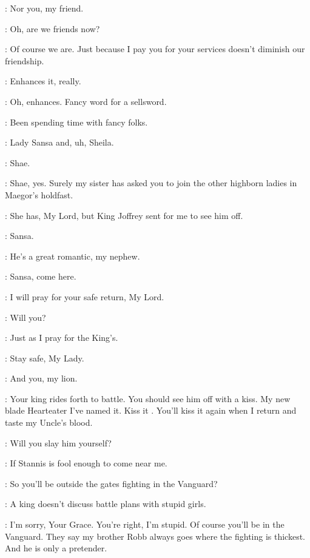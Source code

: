 \TYRION: Nor you, my friend. 

\BRONN: Oh, are we friends now? 

\TYRION: Of course we are. Just because I pay you for your services doesn't diminish our friendship. 

\BRONN: Enhances it, really. 

\TYRION: Oh, enhances. Fancy word for a sellsword. 

\BRONN: Been spending time with fancy folks. 


\TYRION: Lady Sansa and, uh, Sheila. 

\SHAE: Shae. 

\TYRION: Shae, yes. Surely my sister has asked you to join the other highborn ladies in Maegor's holdfast. 

\SANSA: She has, My Lord, but King Joffrey sent for me to see him off. 

\JOFFREY:  Sansa. 

\TYRION: He's a great romantic, my nephew. 

\JOFFREY: Sansa, come here. 

\SANSA: I will pray for your safe return, My Lord. 

\TYRION: Will you? 

\SANSA: Just as I pray for the King's. 


\TYRION:  Stay safe, My Lady. 

\SHAE: And you, my lion. 

\JOFFREY: Your king rides forth to battle. You should see him off with a kiss. My new blade  Hearteater I've named it. Kiss it . You'll kiss it again when I return and taste my Uncle's blood.

\SANSA: Will you slay him yourself? 

\JOFFREY: If Stannis is fool enough to come near me. 

\SANSA: So you'll be outside the gates fighting in the Vanguard? 

\JOFFREY: A king doesn't discuss battle plans with stupid girls. 

\SANSA: I'm sorry, Your Grace. You're right, I'm stupid. Of course you'll be in the Vanguard. They say my brother Robb always goes where the fighting is thickest. And he is only a pretender. 

